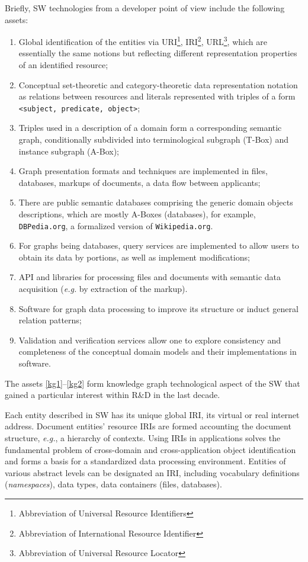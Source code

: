 \documentclass[a4paper]{jctart19a}
\begin{document}
Briefly, SW technologies from a developer point of view include the following assets:
\begin{enumerate}
\item Global identification of the entities via URI\footnote{Abbreviation of Universal Resource Identifiers}, IRI\footnote{Abbreviation of International Resource Identifier}, URL\footnote{Abbreviation of Universal Resource Locator}, which are essentially the same notions but reflecting different representation properties of an identified resource;
\item Conceptual set-theoretic and category-theoretic data representation notation as relations between resources and literals represented with triples of a form \texttt{<subject, predicate, object>};
\item Triples used in a description of a domain form a corresponding semantic graph, conditionally subdivided into terminological subgraph (T-Box) and instance subgraph (A-Box);
\item Graph presentation formats and techniques are implemented in files, databases, markups of documents, a data flow between applicants; \label{kg1}
\item There are public semantic databases comprising the generic domain objects descriptions, which are mostly A-Boxes (databases), for example, \texttt{DBPedia.org}, a formalized version of \texttt{Wikipedia.org}. %
\item For graphs being databases, query services are implemented to allow users to obtain its data by portions, as well as implement modifications;
\item API and libraries for processing files and documents with semantic data acquisition (\emph{e.g.} by extraction of the markup).
\item Software for graph data processing to improve its structure or induct general relation patterns;
\item Validation and verification services allow one to explore consistency and completeness of the conceptual domain models and their implementations in software. \label{kg2}
\end{enumerate}
The assets  \ref{kg1}--\ref{kg2} form knowledge graph technological aspect of the SW that gained a particular interest within R\&D in the last decade.

Each entity described in SW has its unique global IRI, its virtual or real internet address.  Document entities' resource IRIs are formed accounting the document structure, \emph{e.g.}, a hierarchy of contexts.  Using IRIs in applications solves the fundamental problem of cross-domain and cross-application object identification and forms a basis for a standardized data processing environment.  Entities of various abstract levels can be designated an IRI, including vocabulary definitions (\emph{namespaces}), data types, data containers (files, databases).
\end{document}

